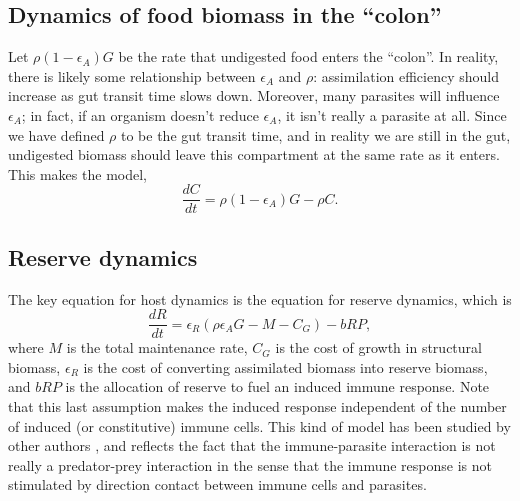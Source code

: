 \documentclass[12pt,reqno,final,pdftex]{amsart}\usepackage[]{graphicx}\usepackage[]{color}
\theoremstyle{plain}
\numberwithin{equation}{part}
\begin{document}
\subsection*{Dynamics of food biomass in the ``colon''}
Let $\rho (1-\epsilon_A) G$ be the rate that undigested food enters the ``colon''.
In reality, there is likely some relationship between $\epsilon_A$ and $\rho$: assimilation efficiency should increase as gut transit time slows down.
Moreover, many parasites will influence $\epsilon_A$; in fact, if an organism doesn't reduce $\epsilon_A$, it isn't really a parasite at all.
Since we have defined $\rho$ to be the gut transit time, and in reality we are still in the gut, undigested biomass should leave this compartment at the same rate as it enters.
This makes the model,
\begin{equation}
\frac{dC}{dt} = \rho (1-\epsilon_A)G - \rho C.
\end{equation}

\subsection*{Reserve dynamics}
The key equation for host dynamics is the equation for reserve dynamics, which is
\begin{equation}
\frac{dR}{dt}=\epsilon _R\left(\rho \epsilon_A G-M-C_G\right)-b R P,
\end{equation}
where $M$ is the total maintenance rate, $C_G$ is the cost of growth in structural biomass, $\epsilon _R$ is the cost of converting assimilated biomass into reserve biomass, and $bRP$ is the allocation of reserve to fuel an induced immune response.
Note that this last assumption makes the induced response independent of the number of induced (or constitutive) immune cells.
This kind of model has been studied by other authors \citep{Bonhoeffer1994,Alizon2005,Fenton2006,Hamilton2008}, and reflects the fact that the immune-parasite interaction is not really a predator-prey interaction in the sense that the immune response is not stimulated by direction contact between immune cells and parasites.
\end{document}
